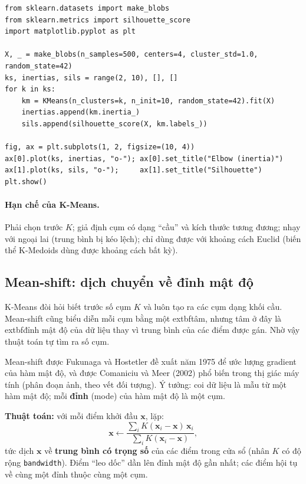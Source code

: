 \begin{lstlisting}[caption={Chọn K bằng elbow và silhouette}]
from sklearn.datasets import make_blobs
from sklearn.metrics import silhouette_score
import matplotlib.pyplot as plt

X, _ = make_blobs(n_samples=500, centers=4, cluster_std=1.0, random_state=42)
ks, inertias, sils = range(2, 10), [], []
for k in ks:
    km = KMeans(n_clusters=k, n_init=10, random_state=42).fit(X)
    inertias.append(km.inertia_)
    sils.append(silhouette_score(X, km.labels_))

fig, ax = plt.subplots(1, 2, figsize=(10, 4))
ax[0].plot(ks, inertias, "o-"); ax[0].set_title("Elbow (inertia)")
ax[1].plot(ks, sils, "o-");     ax[1].set_title("Silhouette")
plt.show()
\end{lstlisting}


\paragraph{Hạn chế của K-Means.} Phải chọn trước $K$; giả định cụm có dạng ``cầu'' và kích thước tương đương; nhạy với ngoại lai (trung bình bị kéo lệch); chỉ dùng được với khoảng cách Euclid (biến thể K-Medoids dùng được khoảng cách bất kỳ).

\subsection{Mean-shift: dịch chuyển về đỉnh mật độ}
\label{sec:meanshift}

K-Means đòi hỏi biết trước số cụm $K$ và luôn tạo ra các cụm dạng khối cầu. Mean-shift cũng biểu diễn mỗi cụm bằng một 	extbf{tâm}, nhưng tâm ở đây là 	extbf{đỉnh mật độ} của dữ liệu thay vì trung bình của các điểm được gán. Nhờ vậy thuật toán tự tìm ra số cụm.


Mean-shift được Fukunaga và Hostetler đề xuất năm 1975 để ước lượng gradient của hàm mật độ, và được Comaniciu và Meer (2002) phổ biến trong thị giác máy tính (phân đoạn ảnh, theo vết đối tượng). Ý tưởng: coi dữ liệu là mẫu từ một hàm mật độ; mỗi \textbf{đỉnh} (mode) của hàm mật độ là một cụm.

\noindent\textbf{Thuật toán:} với mỗi điểm khởi đầu $\mathbf{x}$, lặp:
\begin{equation}
    \mathbf{x} \leftarrow \frac{\sum_{i} K(\mathbf{x}_i - \mathbf{x})\,\mathbf{x}_i}{\sum_{i} K(\mathbf{x}_i - \mathbf{x})},
\end{equation}
tức dịch $\mathbf{x}$ về \textbf{trung bình có trọng số} của các điểm trong cửa sổ (nhân $K$ có độ rộng \texttt{bandwidth}). Điểm ``leo dốc'' dần lên đỉnh mật độ gần nhất; các điểm hội tụ về cùng một đỉnh thuộc cùng một cụm.

